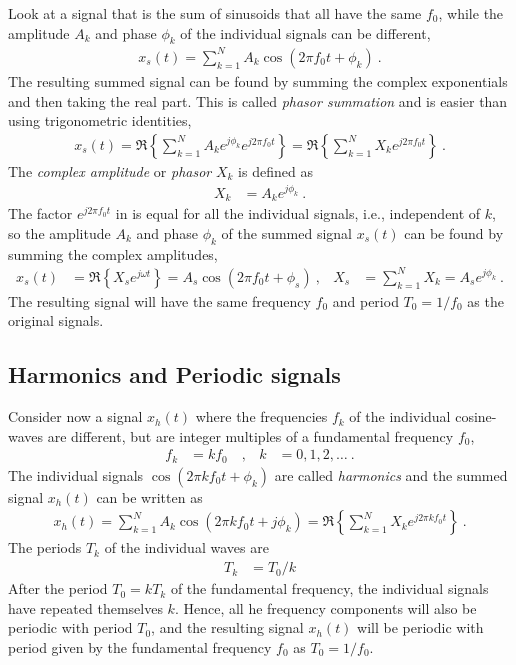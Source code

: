 Look at a signal that is the sum of sinusoids that all have the same $f_0$, while the amplitude $A_k$ and phase $\phi_k$ of the individual signals can be different, 
\begin{align}
	x_s(t)= \sum_{k=1}^{N} A_k \cos(2\pi f_0 t + \phi_k)   \:.
\end{align}
The resulting summed signal can be found by summing the complex exponentials and then taking the real part. This is called \emph{phasor summation} and is  easier than using trigonometric identities, 
\begin{align}
	x_s(t)= \Re\left\{ \sum_{k=1}^{N}  A_k e^{j\phi_k} e^{j2\pi f_0 t } \right\}  
			= \Re\left\{ \sum_{k=1}^{N}  X_k  e^{j2\pi f_0 t } \right\}  \:.
	\label{eq:phasorsum}
\end{align}
The \emph{complex amplitude }or \emph{phasor} $X_k$ is defined as 
\begin{align}
	X_k &= A_k e^{j\phi_k} \:.
\end{align}
The factor $ e^{j2\pi f_0 t}$ in  is equal for all the individual signals, i.e., independent of $k$, so the amplitude $A_k$ and phase $\phi_k$ of the summed signal $x_s(t)$ can be found by summing the complex amplitudes, 
\begin{align}
	x_s(t)&= \Re \left\{ X_s e^{j\omega t } \right\} = A_s \cos(2\pi f_0 t + \phi_s)  \:,
	 &  X_s&= \sum_{k=1}^{N} X_k = A_s e^{j\phi_k}  \:.
\end{align}
The resulting signal will have the same frequency $f_0$ and period $T_0=1/f_0$ as the original signals. 

\subsection{Harmonics and Periodic signals}
Consider now a signal $x_h(t)$ where the frequencies $f_k$ of the individual cosine-waves are different, but are integer multiples of a fundamental frequency $f_0$, 
\begin{align}
	f_k& = k f_0 \quad , & k&= 0,1,2, \ldots \:.
\end{align}
The individual signals $\cos(2\pi k f_0 t +\phi_k)$ are called \emph{harmonics} and the summed signal $x_h(t)$ can be written as
\begin{align}
	x_h(t)= \sum_{k=1}^{N}  A_k \cos(2\pi k f_0 t +j\phi_k)
		= \Re\left\{ \sum_{k=1}^{N}  X_k  e^{j2\pi k f_0 t } \right\}  \:.
		\label{eq:harmonicsum}
\end{align}
The periods $T_k$ of the individual waves are 
\begin{align}
	T_k &= T_0/k
\end{align}
After the period $T_0=k T_k$ of the fundamental frequency, the individual signals have repeated themselves $k$. Hence, all he frequency components will also be periodic with period $T_0$, and the resulting signal $x_h(t)$ will be periodic with period given by the fundamental frequency $f_0$ as $T_0=1/f_0$.

